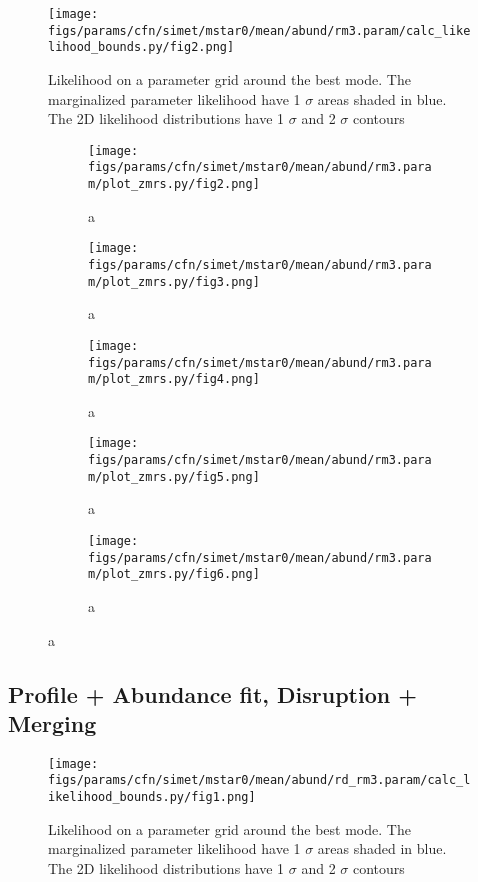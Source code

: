 \documentclass[twocolumn]{article}
\begin{document}
\begin{figure}[H]
  \center\texttt{[image: figs/params/cfn/simet/mstar0/mean/abund/rm3.param/calc\_likelihood\_bounds.py/fig2.png]}
  \caption{Likelihood on a parameter grid around the best mode. The marginalized parameter likelihood have
    1 $\sigma$ areas shaded in blue. The 2D likelihood distributions have 1 $\sigma$  and 2 $\sigma$ contours}
  \label{fig:basic_rd:likelihood}

\end{figure}
\begin{figure}
  \begin{subfigure}{.5\textwidth}
    \centering\texttt{[image: figs/params/cfn/simet/mstar0/mean/abund/rm3.param/plot\_zmrs.py/fig2.png]}
    \caption{a}
  \end{subfigure}
  \begin{subfigure}{.5\textwidth}
    \centering\texttt{[image: figs/params/cfn/simet/mstar0/mean/abund/rm3.param/plot\_zmrs.py/fig3.png]}
    \caption{a}
  \end{subfigure}
  \begin{subfigure}{.5\textwidth}
    \centering\texttt{[image: figs/params/cfn/simet/mstar0/mean/abund/rm3.param/plot\_zmrs.py/fig4.png]}
    \caption{a}
  \end{subfigure}%
  \begin{subfigure}{.5\textwidth}
    \centering\texttt{[image: figs/params/cfn/simet/mstar0/mean/abund/rm3.param/plot\_zmrs.py/fig5.png]}
    \caption{a}
  \end{subfigure}
  \begin{subfigure}{.5\textwidth}
    \centering\texttt{[image: figs/params/cfn/simet/mstar0/mean/abund/rm3.param/plot\_zmrs.py/fig6.png]}
    \caption{a}
  \end{subfigure}
\end{figure}
\clearpage



\subsection{Profile + Abundance fit, Disruption + Merging}
\begin{figure}[H]
  \center\texttt{[image: figs/params/cfn/simet/mstar0/mean/abund/rd\_rm3.param/calc\_likelihood\_bounds.py/fig1.png]}
  \caption{Likelihood on a parameter grid around the best mode. The marginalized parameter likelihood have
    1 $\sigma$ areas shaded in blue. The 2D likelihood distributions have 1 $\sigma$  and 2 $\sigma$ contours}
  \label{fig:basic_rd:likelihood}
\end{figure}
\end{document}
